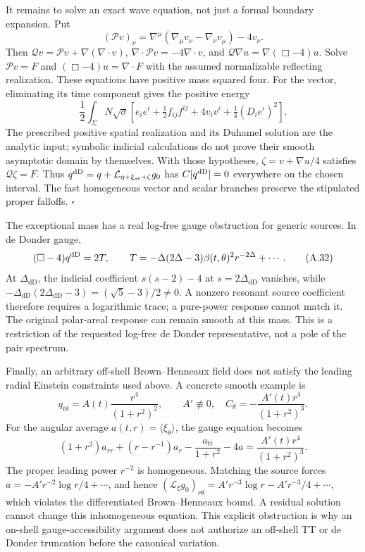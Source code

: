 It remains to solve an exact wave equation, not just a formal boundary expansion. Put \[
(\mathcal Pv)_\nu=\nabla^\mu(\nabla_\mu v_\nu-\nabla_\nu v_\mu)-4v_\nu.
\] Then \(\mathcal Qv=\mathcal Pv+\nabla(\nabla\cdot v)\), \(\nabla\cdot\mathcal Pv=-4\nabla\cdot v\), and \(\mathcal Q\nabla u=\nabla(\Box-4)u\). Solve \(\mathcal Pv=F\) and \((\Box-4)u=\nabla\cdot F\) with the assumed normalizable reflecting realization. These equations have positive mass squared four. For the vector, eliminating its time component gives the positive energy \[
\frac12\int_\Sigma N\sqrt\sigma
\left[e_ie^i+\tfrac12f_{ij}f^{ij}+4v_iv^i
+\tfrac14(D_ie^i)^2\right].
\] The prescribed positive spatial realization and its Duhamel solution are the analytic input; symbolic indicial calculations do not prove their smooth asymptotic domain by themselves. With those hypotheses, \(\zeta=v+\nabla u/4\) satisfies \(\mathcal Q\zeta=F\). Thus \(q^{\rm dD}=q+\mathcal L_{\eta+\xi_{\rm as}+\zeta}g_0\) has \(C[q^{\rm dD}]=0\) everywhere on the chosen interval. The fast homogeneous vector and scalar branches preserve the stipulated proper falloffs. \(\square\)

The exceptional mass has a real log-free gauge obstruction for generic sources. In de Donder gauge, \[
(\Box-4)q^{\rm dD}=2T,
\qquad
T=-\Delta(2\Delta-3)\beta(t,\theta)^2r^{-2\Delta}+\cdots .
\tag{A.32}
\] At \(\Delta_{\mathrm{dD}}\), the indicial coefficient \(s(s-2)-4\) at \(s=2\Delta_{\mathrm{dD}}\) vanishes, while \(-\Delta_{\mathrm{dD}}(2\Delta_{\mathrm{dD}}-3)=(\sqrt5-3)/2\ne0\). A nonzero resonant source coefficient therefore requires a logarithmic trace; a pure-power response cannot match it. The original polar-areal response can remain smooth at this mass. This is a restriction of the requested log-free de Donder representative, not a pole of the pair spectrum.

Finally, an arbitrary off-shell Brown--Henneaux field does not satisfy the leading radial Einstein constraints used above. A concrete smooth example is \[
q_{t\theta}=A(t)\frac{r^4}{(1+r^2)^2},\qquad A'\not\equiv0,
\quad C_\theta=-\frac{A'(t)r^4}{(1+r^2)^3}.
\] For the angular average \(a(t,r)=\langle\xi_\theta\rangle\), the gauge equation becomes \[
(1+r^2)a_{rr}+(r-r^{-1})a_r
-\frac{a_{tt}}{1+r^2}-4a
=\frac{A'(t)r^4}{(1+r^2)^3}.
\tag{A.33}
\] The proper leading power \(r^{-2}\) is homogeneous. Matching the source forces \(a=-A'r^{-2}\log r/4+\cdots\), and hence \((\mathcal L_\xi g_0)_{r\theta}=A'r^{-3}\log r-A'r^{-3}/4+\cdots\), which violates the differentiated Brown--Henneaux bound. A residual solution cannot change this inhomogeneous equation. This explicit obstruction is why an on-shell gauge-accessibility argument does not authorize an off-shell TT or de Donder truncation before the canonical variation.

